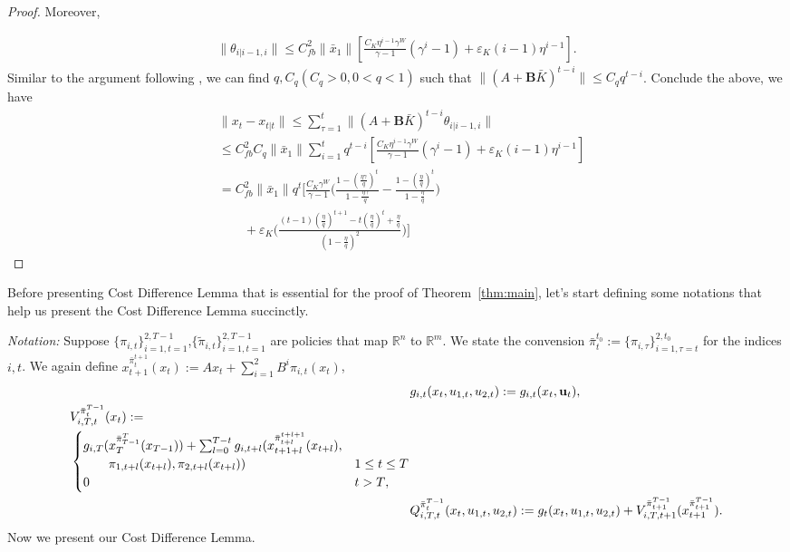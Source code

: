 \documentclass[letterpaper, 10 pt, conference]{ieeeconf}  %
\begin{document}
\begin{proof}
Moreover,

\begin{align*}
    \|\theta_{i|i-1,i}\| \leq C_{fb}^{2}\|\bar{x}_{1}\|[\frac{C_{K}\eta^{i-1}\gamma^{W}}{\gamma-1}(\gamma^{i}-1) + \varepsilon_{K}(i-1)\eta^{i-1}].
\end{align*}
Similar to the argument following \cite[Lemma 10, (25)]{chen_regret_2023}, we can find $q,C_{q}(C_{q}>0,0<q<1)$ such that $\|(A+\mathbf{B}\bar{K})^{t-i}\| \leq C_{q}q^{t-i}$. Conclude the above, we have
\begin{align*}
    &\|x_{t}-x_{t|t}\| \leq \sum_{\tau=1}^{t}\|(A+\mathbf{B}\bar{K})^{t-i}\theta_{i|i-1,i}\|\\
    &\leq C_{fb}^{2}C_{q}\|\bar{x}_{1}\|\sum_{i=1}^{t}q^{t-i}[\frac{C_{K}\eta^{i-1}\gamma^{W}}{\gamma-1}(\gamma^{i}-1) + \varepsilon_{K}(i-1)\eta^{i-1}]\\
    &= C_{fb}^{2}\|\bar{x}_{1}\|q^{t}[\frac{C_{K}\gamma^{W}}{\gamma-1}\bigg(\frac{1-(\frac{\eta\gamma}{q})^{t}}{1-\frac{\eta\gamma}{q}} - \frac{1-(\frac{\eta}{q})^{t}}{1-\frac{\eta}{q}} \bigg)\\
    &\qquad+\varepsilon_{K}\bigg(\frac{(t-1)(\frac{\eta}{q})^{t+1}-t(\frac{\eta}{q})^{t}+\frac{\eta}{q}}{(1-\frac{\eta}{q})^{2}}\bigg)]
\end{align*}
\end{proof}

Before presenting Cost Difference Lemma that is essential for the proof of Theorem~\ref{thm:main}, let's start defining some notations that help us present the Cost Difference Lemma succinctly.

\emph{Notation:} 
Suppose $\{\pi_{i,t}\}_{i=1,t=1}^{2,T-1}$,$\{\tilde{\pi}_{i,t}\}_{i=1,t=1}^{2,T-1}$ are policies that map $\mathbb{R}^{n}$ to $\mathbb{R}^{m}$. We state the convension $\bar{\pi}_{t}^{t_{0}} := \{\pi_{i,\tau}\}_{i=1,\tau=t}^{2,t_{0}}$ for the indices $i,t$.
We again define $x_{t+1}^{\bar{\pi}_{t}^{t+1}}(x_{t}):= Ax_{t} + \sum_{i=1}^{2} B^{i}\pi_{i,t}(x_{t})$,
\begin{align*}
&g_{i,t}(x_{t}, u_{1,t}, u_{2,t}) := g_{i,t}(x_{t}, \mathbf{u}_{t}),\\
\begin{split}
    &V_{i,T,t}^{\bar{\pi}_{t}^{T-1}}(x_{t}) := \\
    &\begin{cases}
        g_{i,T}(x_{T}^{\bar{\pi}_{T-1}^{T}}(x_{T-1}))+\sum_{l=0}^{T-t} g_{i,t+l}(x_{t+1+l}^{\bar{\pi}_{t+l}^{t+l+1}}(x_{t+l}),\\
        \qquad \pi_{1,t+l}(x_{t+l}),\pi_{2,t+l}(x_{t+l})) & \text{$1 \leq t \leq T$}\\
        $0$ & \text{$t > T$},
    \end{cases}
\end{split}
    \\
    &Q_{i,T,t}^{\bar{\pi}_{t}^{T-1}}(x_{t},u_{1,t},u_{2,t}) := g_{t}(x_{t},u_{1,t},u_{2,t}) + V_{i,T,t+1}^{\bar{\pi}_{t+1}^{T-1}}(x_{t+1}^{\bar{\pi}_{t+1}^{T-1}}).
\end{align*}
Now we present our Cost Difference Lemma.
\end{document}

